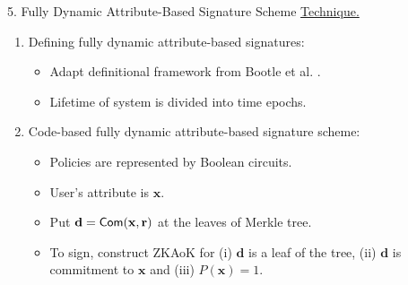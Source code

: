\begin{frame}{5. Fully Dynamic Attribute-Based Signature Scheme}
	\underline{Technique.}
	\begin{enumerate}
		\item Defining fully dynamic attribute-based signatures:
		\begin{itemize}
			\item Adapt definitional framework from Bootle et al. \cite{BootleCCGG16}.
			\item Lifetime of system is divided into time epochs.
		\end{itemize}
		\item Code-based fully dynamic attribute-based signature scheme:
		\begin{itemize}
			\item Policies are represented by Boolean circuits.
			\item User's attribute is $\mathbf{x}$. 
			\item Put $\mathbf{d} = \mathsf{Com }(\mathbf{x}, \mathbf{r})$ at the leaves of Merkle tree. 
			\item To sign, construct ZKAoK for (i) $\mathbf{d}$ is a leaf of the tree, (ii) $\mathbf{d}$ is commitment to $\mathbf{x}$ and (iii) $P(\mathbf{x}) = 1$.
		\end{itemize}
	\end{enumerate}
\end{frame}